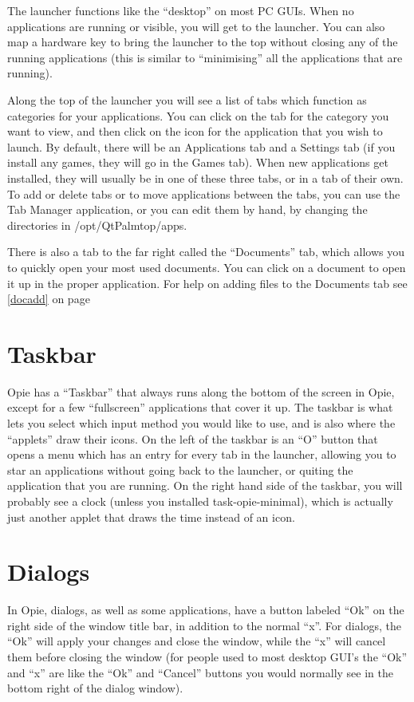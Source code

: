 \documentclass[12pt,letterpaper,oneside, openany]{book} \usepackage[latin1] {inputenc}
\begin{document}
The launcher functions like the ``desktop'' on most PC GUIs.  When no applications are running or visible, you will get to the launcher.  You can also map a hardware key to bring the launcher to the top without closing any of the running applications (this is similar to ``minimising'' all the applications that are running).

Along the top of the launcher you will see a list of tabs which function as categories for your applications.  You can click on the tab for the category you want to view, and then click on the icon for the application that you wish to launch.  By default, there will be an Applications tab and a Settings tab (if you install any games, they will go in the Games tab).  When new applications get installed, they will usually be in one of these three tabs, or in a tab of their own.  To add or delete tabs or to move applications between the tabs, you can use the Tab Manager application, or you can edit them by hand, by changing the directories in /opt/QtPalmtop/apps.

There is also a tab to the far right called the ``Documents'' tab, which allows you to quickly open your most used documents.  You can click on a document to open it up in the proper application.  For help on adding files to the Documents tab see \ref{docadd} on page \pageref{docadd}

\section{Taskbar}

Opie has a ``Taskbar'' that always runs along the bottom of the screen in Opie, except for a few ``fullscreen'' applications that cover it up.  The taskbar is what lets you select which input method you would like to use, and is also where the ``applets'' draw their icons.  On the left of the taskbar is an ``O'' button that opens a menu which has an entry for every tab in the launcher, allowing you to star an applications without going back to the launcher, or quiting the application that you are running.  On the right hand side of the taskbar, you will probably see a clock (unless you installed task-opie-minimal), which is actually just another applet that draws the time instead of an icon.

\section{Dialogs}

In Opie, dialogs, as well as some applications, have a button labeled ``Ok'' on the right side of the window title bar, in addition to the normal ``x''.  For dialogs, the ``Ok'' will apply your changes and close the window, while the ``x'' will cancel them before closing the window (for people used to most desktop GUI's the ``Ok'' and ``x'' are like the ``Ok'' and ``Cancel'' buttons you would normally see in the bottom right of the dialog window).
\end{document}
